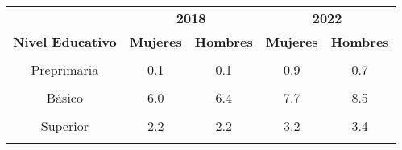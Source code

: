 \begin{tabular}[t]{ccccc}
\toprule
\multicolumn{1}{c}{\textbf{ }} & \multicolumn{2}{c}{\textbf{2018}} & \multicolumn{2}{c}{\textbf{2022}} \\
\cmidrule(l{3pt}r{3pt}){2-3} \cmidrule(l{3pt}r{3pt}){4-5}
\textbf{Nivel Educativo} & \textbf{Mujeres} & \textbf{Hombres} & \textbf{Mujeres} & \textbf{Hombres}\\
\midrule
\cellcolor[HTML]{B6B3FF}{Ninguno} & \cellcolor[HTML]{B6B3FF}{9.9} & \cellcolor[HTML]{B6B3FF}{5.0} & \cellcolor[HTML]{B6B3FF}{12.4} & \cellcolor[HTML]{B6B3FF}{6.2}\\
Preprimaria & 0.1 & 0.1 & 0.9 & 0.7\\
\cellcolor[HTML]{B6B3FF}{Primaria} & \cellcolor[HTML]{B6B3FF}{16.2} & \cellcolor[HTML]{B6B3FF}{15.5} & \cellcolor[HTML]{B6B3FF}{19.8} & \cellcolor[HTML]{B6B3FF}{17.0}\\
Básico & 6.0 & 6.4 & 7.7 & 8.5\\
\cellcolor[HTML]{B6B3FF}{Diversificado} & \cellcolor[HTML]{B6B3FF}{7.6} & \cellcolor[HTML]{B6B3FF}{7.6} & \cellcolor[HTML]{B6B3FF}{10.4} & \cellcolor[HTML]{B6B3FF}{9.3}\\
Superior & 2.2 & 2.2 & 3.2 & 3.4\\
\cellcolor[HTML]{B6B3FF}{Posgrado} & \cellcolor[HTML]{B6B3FF}{0.1} & \cellcolor[HTML]{B6B3FF}{0.1} & \cellcolor[HTML]{B6B3FF}{0.3} & \cellcolor[HTML]{B6B3FF}{0.3}\\
\bottomrule
\end{tabular}
